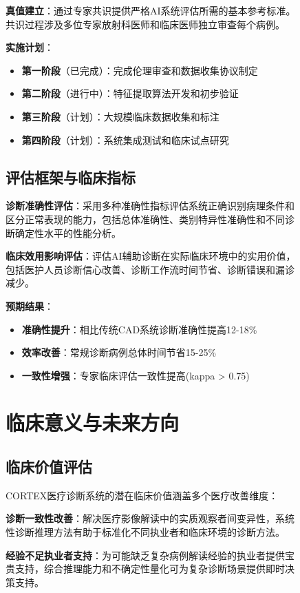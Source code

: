 \begin{figure}[htbp]
\textbf{真值建立}：通过专家共识提供严格AI系统评估所需的基本参考标准。共识过程涉及多位专家放射科医师和临床医师独立审查每个病例。

\textbf{实施计划}：
\begin{itemize}
\item \textbf{第一阶段}（已完成）：完成伦理审查和数据收集协议制定
\item \textbf{第二阶段}（进行中）：特征提取算法开发和初步验证
\item \textbf{第三阶段}（计划）：大规模临床数据收集和标注
\item \textbf{第四阶段}（计划）：系统集成测试和临床试点研究
\end{itemize}

\subsection{评估框架与临床指标}

\textbf{诊断准确性评估}：采用多种准确性指标评估系统正确识别病理条件和区分正常表现的能力，包括总体准确性、类别特异性准确性和不同诊断确定性水平的性能分析。

\textbf{临床效用影响评估}：评估AI辅助诊断在实际临床环境中的实用价值，包括医护人员诊断信心改善、诊断工作流时间节省、诊断错误和漏诊减少。

\textbf{预期结果}：
\begin{itemize}
\item \textbf{准确性提升}：相比传统CAD系统诊断准确性提高12-18\%
\item \textbf{效率改善}：常规诊断病例总体时间节省15-25\%
\item \textbf{一致性增强}：专家临床评估一致性提高(kappa > 0.75)
\end{itemize}

\section{临床意义与未来方向}

\subsection{临床价值评估}

CORTEX医疗诊断系统的潜在临床价值涵盖多个医疗改善维度：

\textbf{诊断一致性改善}：解决医疗影像解读中的实质观察者间变异性，系统性诊断推理方法有助于标准化不同执业者和临床环境的诊断方法。

\textbf{经验不足执业者支持}：为可能缺乏复杂病例解读经验的执业者提供宝贵支持，综合推理能力和不确定性量化可为复杂诊断场景提供即时决策支持。


\end{figure}
